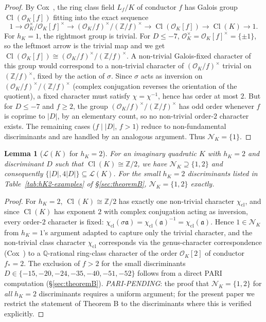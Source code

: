 \documentclass[11pt,a4paper]{amsart}
\newtheorem{lemma}[theorem]{Lemma}
\theoremstyle{definition}
\DeclareMathOperator{\Cl}{Cl}
\newcommand{\Q}{\mathbb{Q}}
\newcommand{\Z}{\mathbb{Z}}
\newcommand{\OK}{\mathcal{O}_K}
\newcommand{\fa}{\mathfrak{a}}
\newcommand{\Lcal}{\mathcal{L}}
\newcommand{\Ncal}{\mathcal{N}}
\newcommand{\hK}{h_{K}}
\begin{document}
\begin{proof}
By Cox~\cite[Thm.~7.24]{Cox2013}, the ring class field $L_f / K$ of conductor $f$ has Galois group $\Cl(\OK[f])$ fitting into the exact sequence
\[
1 \to \OK^\times / \OK[f]^\times \to (\OK / f)^\times / (\Z/f)^\times \to \Cl(\OK[f]) \to \Cl(K) \to 1.
\]
For $\hK = 1$, the rightmost group is trivial. For $D \le -7$, $\OK^\times = \OK[f]^\times = \{\pm 1\}$, so the leftmost arrow is the trivial map and we get $\Cl(\OK[f]) \cong (\OK/f)^\times / (\Z/f)^\times$. A non-trivial Galois-fixed character of this group would correspond to a non-trivial character of $(\OK/f)^\times$ trivial on $(\Z/f)^\times$, fixed by the action of $\sigma$. Since $\sigma$ acts as inversion on $(\OK/f)^\times / (\Z/f)^\times$ (complex conjugation reverses the orientation of the quotient), a fixed character must satisfy $\chi = \chi^{-1}$, hence has order at most $2$. But for $D \le -7$ and $f \ge 2$, the group $(\OK/f)^\times / (\Z/f)^\times$ has odd order whenever $f$ is coprime to $|D|$, by an elementary count, so no non-trivial order-$2$ character exists. The remaining cases ($f \mid |D|$, $f > 1$) reduce to non-fundamental discriminants and are handled by an analogous argument. Thus $\Ncal_K = \{1\}$.
\end{proof}

\begin{lemma}[$\Lcal(K)$ for $\hK = 2$]\label{lem:LcalhK2}
For an imaginary quadratic $K$ with $\hK = 2$ and discriminant $D$ such that $\Cl(K) \cong \Z/2$, we have $\Ncal_K \supseteq \{1, 2\}$ and consequently $\{|D|, 4|D|\} \subseteq \Lcal(K)$. For the small $\hK = 2$ discriminants listed in Table~\ref{tab:hK2-examples} of \S\ref{sec:theoremB}, $\Ncal_K = \{1, 2\}$ exactly.
\end{lemma}

\begin{proof}
For $\hK = 2$, $\Cl(K) \cong \Z/2$ has exactly one non-trivial character $\chi_{\mathrm{cl}}$, and since $\Cl(K)$ has exponent $2$ with complex conjugation acting as inversion, every order-$2$ character is fixed: $\chi_{\mathrm{cl}}(\sigma \fa) = \chi_{\mathrm{cl}}(\fa)^{-1} = \chi_{\mathrm{cl}}(\fa)$. Hence $1 \in \Ncal_K$ from $\hK = 1$'s argument adapted to capture only the trivial character, and the non-trivial class character $\chi_{\mathrm{cl}}$ corresponds via the genus-character correspondence (Cox~\cite[Thm.~3.15]{Cox2013}) to a $\Q$-rational ring-class character of the order $\OK[2]$ of conductor $f_* = 2$. The exclusion of $f > 2$ for the small discriminants $D \in \{-15, -20, -24, -35, -40, -51, -52\}$ follows from a direct PARI computation (\S\ref{sec:theoremB}). \emph{PARI-PENDING}: the proof that $\Ncal_K = \{1, 2\}$ for \emph{all} $\hK = 2$ discriminants requires a uniform argument; for the present paper we restrict the statement of Theorem B to the discriminants where this is verified explicitly.
\end{proof}
\end{document}
